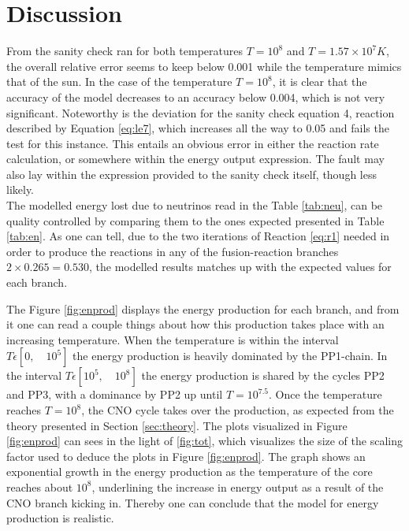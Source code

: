 \documentclass[10pt, nofootinbib, twocolumn]{revtex4-1}
\begin{document}
\section{Discussion}\label{sec:discussion}
From the sanity check ran for both temperatures $T=10^8$ and $T=1.57\times10^7K$, the overall relative error seems to keep below 0.001 while the temperature mimics that of the sun. In the case of the temperature $T=10^8$, it is clear that the accuracy of the model decreases to an accuracy below 0.004, which is not very significant. Noteworthy is the deviation for the sanity check equation 4, reaction described by Equation \eqref{eq:le7}, which increases all the way to 0.05 and fails the test for this instance. This entails an obvious error in either the reaction rate calculation, or somewhere within the energy output expression. The fault may also lay within the expression provided to the sanity check itself, though less likely. \\

The modelled energy lost due to neutrinos read in the Table \ref{tab:neu}, can be quality controlled by comparing them to the ones expected presented in Table \ref{tab:en}. As one can tell, due to the two iterations of Reaction \eqref{eq:r1} needed in order to produce the reactions in any of the fusion-reaction branches $2\times 0.265=0.530$,  the modelled results matches up with the expected values for each branch. \\
\newpage

The Figure \ref{fig:enprod} displays the energy production for each branch, and from it one can read a couple things about how this production takes place with an increasing temperature. When the temperature is within the interval $T\epsilon [0, \quad 10^{5}]$ the energy production is heavily dominated by the PP1-chain. In the interval $T \epsilon [10^5, \quad 10^{8}]$ the energy production is shared by the cycles PP2 and PP3, with a dominance by PP2 up until $T=10^{7.5}$. Once the temperature reaches $T=10^8$, the CNO cycle takes over the production, as expected from the theory presented in Section \ref{sec:theory}. The plots visualized in Figure \ref{fig:enprod} can sees in the light of \ref{fig:tot}, which visualizes the size of the scaling factor used to deduce the plots in Figure \ref{fig:enprod}. The graph shows an exponential growth in the energy production as the temperature of the core reaches about $10^8$, underlining the increase in energy output as a result of the CNO branch kicking in. Thereby one can conclude that the model for energy production is realistic. \\
\end{document}
